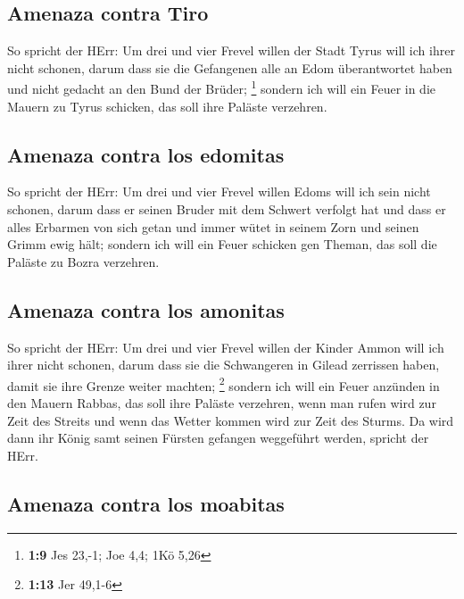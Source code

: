 \hypertarget{amenaza-contra-tiro}{%
\subsection{Amenaza contra Tiro}\label{amenaza-contra-tiro}}

 So spricht der HErr: Um drei und vier Frevel willen der
Stadt Tyrus will ich ihrer nicht schonen, darum dass sie die Gefangenen
alle an Edom überantwortet haben und nicht gedacht an den Bund der
Brüder; \footnote{\textbf{1:9} Jes 23,-1; Joe 4,4; 1Kö 5,26}
 sondern ich will ein Feuer in die Mauern zu Tyrus
schicken, das soll ihre Paläste verzehren.

\hypertarget{amenaza-contra-los-edomitas}{%
\subsection{Amenaza contra los
edomitas}\label{amenaza-contra-los-edomitas}}

 So spricht der HErr: Um drei und vier Frevel willen
Edoms will ich sein nicht schonen, darum dass er seinen Bruder mit dem
Schwert verfolgt hat und dass er alles Erbarmen von sich getan und immer
wütet in seinem Zorn und seinen Grimm ewig hält;  sondern
ich will ein Feuer schicken gen Theman, das soll die Paläste zu Bozra
verzehren.

\hypertarget{amenaza-contra-los-amonitas}{%
\subsection{Amenaza contra los
amonitas}\label{amenaza-contra-los-amonitas}}

 So spricht der HErr: Um drei und vier Frevel willen der
Kinder Ammon will ich ihrer nicht schonen, darum dass sie die
Schwangeren in Gilead zerrissen haben, damit sie ihre Grenze weiter
machten; \footnote{\textbf{1:13} Jer 49,1-6}  sondern ich
will ein Feuer anzünden in den Mauern Rabbas, das soll ihre Paläste
verzehren, wenn man rufen wird zur Zeit des Streits und wenn das Wetter
kommen wird zur Zeit des Sturms.  Da wird dann ihr König
samt seinen Fürsten gefangen weggeführt werden, spricht der HErr.

\hypertarget{amenaza-contra-los-moabitas}{%
\subsection{Amenaza contra los
moabitas}\label{amenaza-contra-los-moabitas}}


